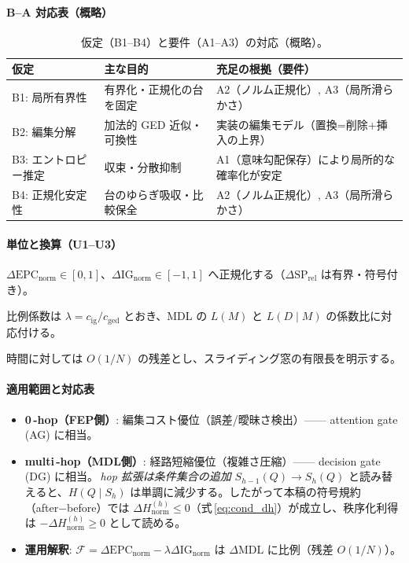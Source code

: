\documentclass[ja=standard,xelatex]{bxjsarticle}
\newcommand{\F}{\mathcal{F}}
\newcommand{\gednorm}{\Delta\mathrm{EPC}_{\mathrm{norm}}}
\newcommand{\ignorm}{\Delta\mathrm{IG}_{\mathrm{norm}}}
\begin{document}
\paragraph{B–A 対応表（概略）}
\begin{table}[H]
  \centering
  \small
  \begin{tabular}{@{}l l l@{}}
    \toprule
    仮定 & 主な目的 & 充足の根拠（要件） \\
    \midrule
    B1: 局所有界性 & 有界化・正規化の台を固定 & A2（ノルム正規化）, A3（局所滑らかさ） \\
    B2: 編集分解 & 加法的 GED 近似・可換性 & 実装の編集モデル（置換=削除+挿入の上界） \\
    B3: エントロピー推定 & 収束・分散抑制 & A1（意味勾配保存）により局所的な確率化が安定 \\
    B4: 正規化安定性 & 台のゆらぎ吸収・比較保全 & A2（ノルム正規化）, A3（局所滑らかさ） \\
    \bottomrule
  \end{tabular}
  \caption{仮定（B1–B4）と要件（A1–A3）の対応（概略）。}
  \label{tab:ba_mapping}
\end{table}

\paragraph{単位と換算（U1–U3）}
\begin{description}[leftmargin=1.8em]
  \item[(U1)] $\gednorm\in[0,1]$、$\ignorm\in[-1,1]$ へ正規化する（$\Delta\mathrm{SP}_{\mathrm{rel}}$ は有界・符号付き）。
  \item[(U2)] 比例係数は $\lambda=c_{\mathrm{ig}}/c_{\mathrm{ged}}$ とおき、MDL の $L(M)$ と $L(D\mid M)$ の係数比に対応付ける。
  \item[(U3)] 時間に対しては $O(1/N)$ の残差とし、スライディング窓の有限長を明示する。
\end{description}

\paragraph{適用範囲と対応表}
\begin{itemize}[leftmargin=1.6em]
  \item \textbf{0\,\mbox{-}hop（FEP側）}: 編集コスト優位（誤差/曖昧さ検出）—— attention gate (AG) に相当。
  \item \textbf{multi\,\mbox{-}hop（MDL側）}: 経路短縮優位（複雑さ圧縮）—— decision gate (DG) に相当。\,\emph{hop 拡張は条件集合の追加} $S_{h-1}(Q)\to S_h(Q)$ と読み替えると、$H(Q\mid S_h)$ は単調に減少する。したがって本稿の符号規約（after−before）では $\Delta H^{(h)}_{\mathrm{norm}}\le0$（式\,\ref{eq:cond_dh}）が成立し、秩序化利得は $-\Delta H^{(h)}_{\mathrm{norm}}\ge0$ として読める。
  \item \textbf{運用解釈}: $\F=\gednorm-\lambda\ignorm$ は $\Delta\mathrm{MDL}$ に比例（残差 $O(1/N)$）。
  \end{itemize}
\end{document}

